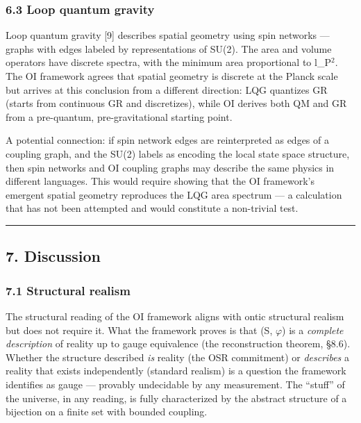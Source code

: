 \documentclass[
  11pt,
]{article}
\begin{document}
\hypertarget{loop-quantum-gravity}{%
\subsubsection{6.3 Loop quantum gravity}\label{loop-quantum-gravity}}

Loop quantum gravity {[}9{]} describes spatial geometry using spin
networks --- graphs with edges labeled by representations of SU(2). The
area and volume operators have discrete spectra, with the minimum area
proportional to l\_P\ensuremath{^2}. The OI framework agrees that spatial geometry is
discrete at the Planck scale but arrives at this conclusion from a
different direction: LQG quantizes GR (starts from continuous GR and
discretizes), while OI derives both QM and GR from a pre-quantum,
pre-gravitational starting point.

A potential connection: if spin network edges are reinterpreted as edges
of a coupling graph, and the SU(2) labels as encoding the local state
space structure, then spin networks and OI coupling graphs may describe
the same physics in different languages. This would require showing that
the OI framework's emergent spatial geometry reproduces the LQG area
spectrum --- a calculation that has not been attempted and would
constitute a non-trivial test.

\begin{center}\rule{0.5\linewidth}{0.5pt}\end{center}

\hypertarget{discussion}{%
\subsection{7. Discussion}\label{discussion}}

\hypertarget{structural-realism}{%
\subsubsection{7.1 Structural realism}\label{structural-realism}}

The structural reading of the OI framework aligns with ontic structural
realism but does not require it. What the framework proves is that (S,
\(\varphi\)) is a \emph{complete description} of reality up to gauge
equivalence (the reconstruction theorem, §8.6). Whether the structure
described \emph{is} reality (the OSR commitment) or \emph{describes} a
reality that exists independently (standard realism) is a question the
framework identifies as gauge --- provably undecidable by any
measurement. The ``stuff'' of the universe, in any reading, is fully
characterized by the abstract structure of a bijection on a finite set
with bounded coupling.
\end{document}
